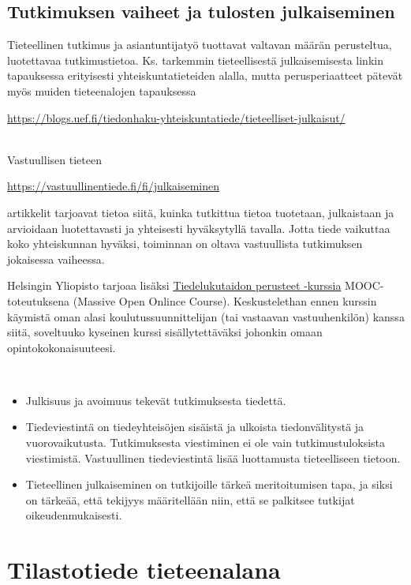 \documentclass[
]{book}
\providecommand{\tightlist}{%
  \setlength{\itemsep}{0pt}\setlength{\parskip}{0pt}}
\begin{document}
\hypertarget{alaluku25}{%
\section{Tutkimuksen vaiheet ja tulosten julkaiseminen}\label{alaluku25}}

Tieteellinen tutkimus ja asiantuntijatyö tuottavat valtavan määrän perusteltua, luotettavaa tutkimustietoa. Ks. tarkemmin tieteellisestä julkaisemisesta linkin tapauksessa erityisesti yhteiskuntatieteiden alalla, mutta perusperiaatteet pätevät myös muiden tieteenalojen tapauksessa

\url{https://blogs.uef.fi/tiedonhaku-yhteiskuntatiede/tieteelliset-julkaisut/}\strut \\

Vastuullisen tieteen

\url{https://vastuullinentiede.fi/fi/julkaiseminen}

artikkelit tarjoavat tietoa siitä, kuinka tutkittua tietoa tuotetaan, julkaistaan ja arvioidaan luotettavasti ja yhteisesti hyväksytyllä tavalla. Jotta tiede vaikuttaa koko yhteiskunnan hyväksi, toiminnan on oltava vastuullista tutkimuksen jokaisessa vaiheessa.

Helsingin Yliopisto tarjoaa lisäksi \href{https://tiedelukutaito.mooc.fi/}{Tiedelukutaidon perusteet -kurssia} MOOC-toteutuksena (Massive Open Onlince Course). Keskustelethan ennen kurssin käymistä oman alasi koulutussuunnittelijan (tai vastaavan vastuuhenkilön) kanssa siitä, soveltuuko kyseinen kurssi sisällytettäväksi johonkin omaan opintokokonaisuuteesi.\\
\strut \\

\begin{itemize}
\tightlist
\item
  Julkisuus ja avoimuus tekevät tutkimuksesta tiedettä.
\item
  Tiedeviestintä on tiedeyhteisöjen sisäistä ja ulkoista tiedonvälitystä ja vuorovaikutusta. Tutkimuksesta viestiminen ei ole vain tutkimustuloksista viestimistä. Vastuullinen tiedeviestintä lisää luottamusta tieteelliseen tietoon.
\item
  Tieteellinen julkaiseminen on tutkijoille tärkeä meritoitumisen tapa, ja siksi on tärkeää, että tekijyys määritellään niin, että se palkitsee tutkijat oikeudenmukaisesti.
\end{itemize}

\hypertarget{luku3}{%
\chapter{Tilastotiede tieteenalana}\label{luku3}}
\end{document}
